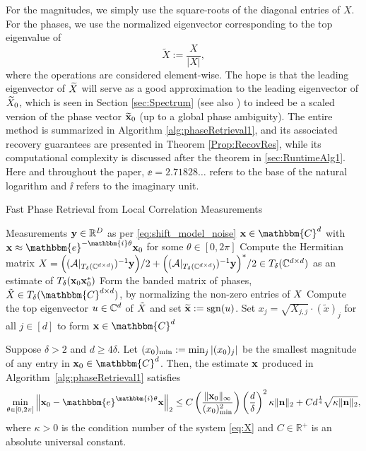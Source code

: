   For the magnitudes, we simply use the square-roots of the diagonal entries of $X$. For the phases, we use the normalized eigenvector corresponding to the top eigenvalue of \begin{equation}\widetilde{X}:=\frac{X}{|X|},\label{eq:Xtilde}\end{equation}
where the operations are considered element-wise.  The hope is that the leading eigenvector of $\widetilde{X}$ will serve as a good approximation to the leading eigenvector of $\widetilde{X}_0$, which is seen in Section \ref{sec:Spectrum} (see also \cite{IV_SPIE}) to indeed be a scaled version of the phase vector $\widetilde{\mathbf x}_0$ (up to a global phase ambiguity).  The entire method is summarized in Algorithm \ref{alg:phaseRetrieval1}, and its associated recovery guarantees are presented in Theorem \ref{Prop:RecovRes}, while its computational complexity is discussed after the theorem in \cref{sec:RuntimeAlg1}.  Here and throughout the paper, $\ee = 2.71828\ldots$ refers to the base of the natural logarithm and $\ii$ refers to the imaginary unit.
\begin{algorithm}
\renewcommand{\algorithmicrequire}{\textbf{Input:}}
\renewcommand{\algorithmicensure}{\textbf{Output:}}
\caption{Fast Phase Retrieval from Local Correlation Measurements}
\label{alg:phaseRetrieval1}
\begin{algorithmic}[1]
    \REQUIRE Measurements $\mathbf y\in \mathbb{R}^D$ as per \eqref{eq:shift_model_noise}
    \ENSURE ${\bf x} \in \mathbbm{C}^d$ with ${\bf x} \approx \mathbbm{e}^{-\mathbbm{i} \theta} {\bf x}_0$ for some $\theta \in [0, 2 \pi]$
    \STATE Compute the Hermitian matrix $X = \Big( (\mathcal{A}|_{T_\delta(\mathbb{C}^{d\times d})})^{-1} {\bf y}\Big)/2 + \Big( (\mathcal{A}|_{T_\delta(\mathbb{C}^{d\times d})})^{-1} {\bf y}\Big)^*/2  \in T_\delta(\mathbb{C}^{d\times d})$ as an estimate of $T_\delta(\mathbf x_0\mathbf x_0^*)$%
    \STATE Form the banded matrix of phases, $\tilde{\X} \in T_\delta(\mathbbm{C}^{d \times d})$, by normalizing the non-zero entries of $X$ %
    \STATE Compute the top eigenvector $u \in \mathbb{C}^d$ of $\tilde{X}$ and set $\widetilde{\mathbf x} := \mathrm{sgn}(u)$.
    \STATE Set $x_j = \sqrt{X_{j,j}} \cdot (\tilde{x})_j$ for all $j \in [d]$ to form $\x \in \mathbbm{C}^d$
    \end{algorithmic}
\end{algorithm}


\begin{theorem}
Suppose $\delta > 2$ and $d \ge 4 \delta$.  Let $(x_0)_{\rm min} := \min_j |(x_0)_j|$ be the smallest magnitude of any entry in $\x_0 \in \mathbbm{C}^d$.  Then, the estimate $\mathbf x$ produced in Algorithm~\ref{alg:phaseRetrieval1} satisfies 
\[ \min_{\theta \in [0, 2 \pi]} \left\Vert  \x_0 - \mathbbm{e}^{\mathbbm{i} \theta} \x \right\Vert_2 \leq C \left( \frac{\Vert \x_0 
        \Vert_{\infty}}{(x_0)^2_{\rm min}} \right) \left( \frac{d}{\delta} \right)^2 \kappa \| \n \|_2 + C d^{\frac{1}{4}} \sqrt{\kappa \| \n \|_2 },\]
where $\kappa > 0$ is the condition number of the system \eqref{eq:X} and $C \in \mathbb{R}^+$ is an absolute universal constant.
\label{Prop:RecovRes}
\end{theorem}

